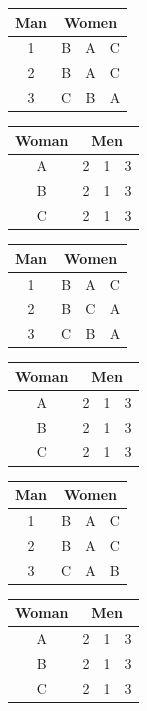 \documentclass[11pt]{article}
\begin{document}
\begin{qunlist}
\begin{itemize}
{\begin{center}
\begin{tabular}{|c|ccc|}\hline 
Man&\multicolumn{3}{|c|}{Women}\\\hline 
1&B&A&C\\\hline 
2&B&A&C\\\hline 
3&C&B&A\\\hline
\end{tabular} 
\hspace{2cm}
\begin{tabular}{|c|ccc|}\hline 
Woman&\multicolumn{3}{|c|}{Men}\\\hline 
A&2&1&3\\\hline 
B&2&1&3\\\hline 
C&2&1&3\\\hline
\end{tabular}
\end{center}

\begin{center}
\begin{tabular}{|c|ccc|}\hline 
Man&\multicolumn{3}{|c|}{Women}\\\hline 
1&B&A&C\\\hline 
2&B&C&A\\\hline 
3&C&B&A\\\hline
\end{tabular} 
\hspace{2cm}
\begin{tabular}{|c|ccc|}\hline 
Woman&\multicolumn{3}{|c|}{Men}\\\hline 
A&2&1&3\\\hline 
B&2&1&3\\\hline 
C&2&1&3\\\hline
\end{tabular}
\end{center}

\begin{center}
\begin{tabular}{|c|ccc|}\hline 
Man&\multicolumn{3}{|c|}{Women}\\\hline 
1&B&A&C\\\hline 
2&B&A&C\\\hline 
3&C&A&B\\\hline
\end{tabular} 
\hspace{2cm}
\begin{tabular}{|c|ccc|}\hline 
Woman&\multicolumn{3}{|c|}{Men}\\\hline 
A&2&1&3\\\hline 
B&2&1&3\\\hline 
C&2&1&3\\\hline
\end{tabular}
\end{center}

}
\end{itemize}
\end{qunlist}
\end{document}
